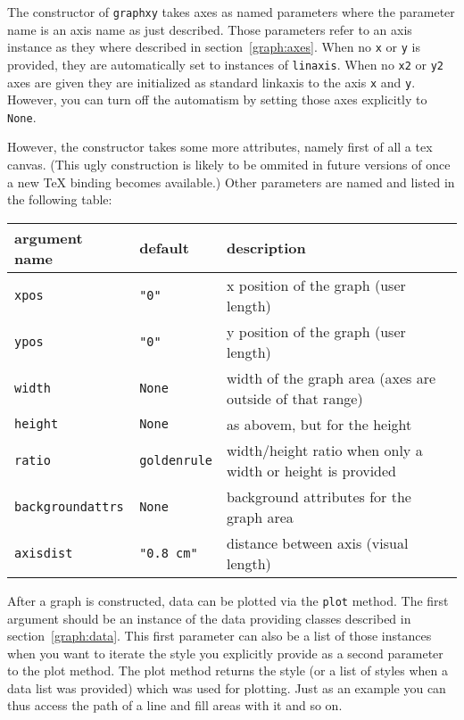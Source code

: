 The constructor of \verb|graphxy| takes axes as named parameters where
the parameter name is an axis name as just described. Those parameters
refer to an axis instance as they where described in
section~\ref{graph:axes}. When no \verb|x| or \verb|y| is provided,
they are automatically set to instances of \verb|linaxis|. When no
\verb|x2| or \verb|y2| axes are given they are initialized as standard
linkaxis to the axis \verb|x| and \verb|y|. However, you can turn off
the automatism by setting those axes explicitly to \verb|None|.

However, the constructor takes some more attributes, namely first of
all a tex canvas. (This ugly construction is likely to be ommited in
future versions of \PyX{} once a new \TeX{} binding becomes
available.) Other parameters are named and listed in the following
table:

\medskip
\begin{tabularx}{\linewidth}{ll>{\raggedright\arraybackslash}X}
argument name&default&description\\
\hline
\texttt{xpos}&\texttt{"0"}&x position of the graph (user length)\\
\texttt{ypos}&\texttt{"0"}&y position of the graph (user length)\\
\texttt{width}&\texttt{None}&width of the graph area (axes are outside of that range)\\
\texttt{height}&\texttt{None}&as abovem, but for the height\\
\texttt{ratio}&\texttt{goldenrule}&width/height ratio when only a width or height is provided\\
\texttt{backgroundattrs}&\texttt{None}&background attributes for the graph area\\
\texttt{axisdist}&\texttt{"0.8 cm"}&distance between axis (visual length)\\
\end{tabularx}
\medskip

After a graph is constructed, data can be plotted via the \verb|plot|
method. The first argument should be an instance of the data providing
classes described in section~\ref{graph:data}. This first parameter
can also be a list of those instances when you want to iterate the
style you explicitly provide as a second parameter to the plot method.
The plot method returns the style (or a list of styles when a data
list was provided) which was used for plotting. Just as an example you
can thus access the path of a line and fill areas with it and so on.

